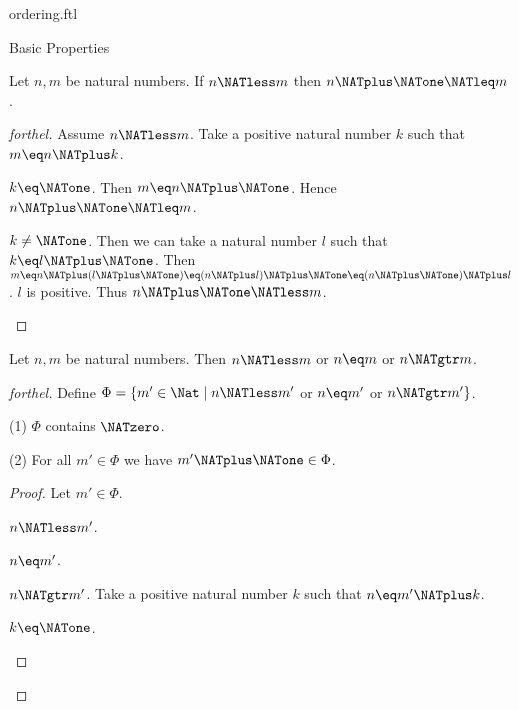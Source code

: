 \documentclass{naproche-library}
\begin{document}
\begin{smodule}[title=The Standard Ordering of the Natural Numbers]{ordering.ftl}
\begin{sfragment}{Basic Properties}
  \begin{proposition}[forthel,id=ARITHMETIC_04_8584998051381248]
    Let $n, m$ be natural numbers.
    If $n \NATless m$ then $n \NATplus \NATone \NATleq m$.
  \end{proposition}
  \begin{proof}[forthel]
    Assume $n \NATless m$.
    Take a positive natural number $k$ such that $m \eq n \NATplus k$.

    \begin{case}{$k \eq \NATone$.}
      Then $m \eq n \NATplus \NATone$.
      Hence $n \NATplus \NATone \NATleq m$.
    \end{case}

    \begin{case}{$k \neq \NATone$.}
      Then we can take a natural number $l$ such that $k \eq l \NATplus \NATone$.
      Then $m
        \eq n \NATplus (l \NATplus \NATone)
        \eq (n \NATplus l) \NATplus \NATone
        \eq (n \NATplus \NATone) \NATplus l$.
      $l$ is positive.
      Thus $n \NATplus \NATone \NATless m$.
    \end{case}
  \end{proof}

  \begin{proposition}[forthel,id=ARITHMETIC_04_8201937860165632]
    Let $n, m$ be natural numbers.
    Then $n \NATless m$ or $n \eq m$ or $n \NATgtr m$.
  \end{proposition}
  \begin{proof}[forthel]
    Define $\Phi = \{ m' \in \Nat \mid n \NATless m'$ or $n \eq m'$ or $n \NATgtr m' \}$.

    (1) $\Phi$ contains $\NATzero$.

    (2) For all $m' \in \Phi$ we have $m' \NATplus \NATone \in \Phi$.
    \begin{proof}
      Let $m' \in \Phi$.

      \begin{case}{$n \NATless m'$.} \end{case}

      \begin{case}{$n \eq m'$.} \end{case}

      \begin{case}{$n \NATgtr m'$.}
        Take a positive natural number $k$ such that $n \eq m' \NATplus k$.

        \begin{case}{$k \eq \NATone$.} \end{case}


\end{case}
\end{proof}
\end{proof}
\end{sfragment}
\end{smodule}
\end{document}
